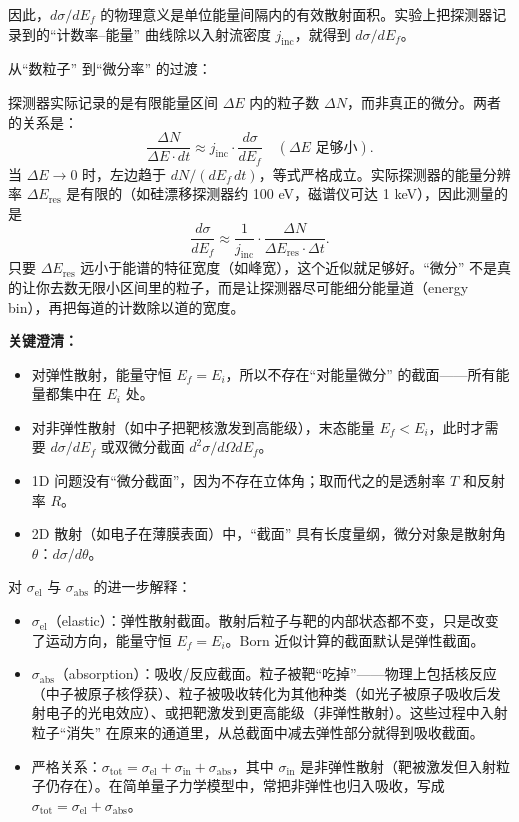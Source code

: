 \begin{derivationbox}[``截面'' 家族：各种微分截面的定义]
因此，$d\sigma/dE_f$ 的物理意义是单位能量间隔内的有效散射面积。实验上把探测器记录到的``计数率--能量'' 曲线除以入射流密度 $j_{\text{inc}}$，就得到 $d\sigma/dE_f$。

从``数粒子'' 到``微分率'' 的过渡：

探测器实际记录的是有限能量区间 $\Delta E$ 内的粒子数 $\Delta N$，而非真正的微分。两者的关系是：
\[
\frac{\Delta N}{\Delta E \cdot dt} \approx j_{\text{inc}} \cdot \frac{d\sigma}{dE_f} \quad (\Delta E \text{ 足够小}).
\]
当 $\Delta E \to 0$ 时，左边趋于 $dN/(dE_f\, dt)$，等式严格成立。实际探测器的能量分辨率 $\Delta E_{\text{res}}$ 是有限的（如硅漂移探测器约 100 eV，磁谱仪可达 1 keV），因此测量的是
\[
\frac{d\sigma}{dE_f} \approx \frac{1}{j_{\text{inc}}} \cdot \frac{\Delta N}{\Delta E_{\text{res}} \cdot \Delta t}.
\]
只要 $\Delta E_{\text{res}}$ 远小于能谱的特征宽度（如峰宽），这个近似就足够好。``微分'' 不是真的让你去数无限小区间里的粒子，而是让探测器尽可能细分能量道（energy bin），再把每道的计数除以道的宽度。

\textbf{关键澄清：}
\begin{itemize}
    \item 对弹性散射，能量守恒 $E_f = E_i$，所以不存在``对能量微分'' 的截面——所有能量都集中在 $E_i$ 处。
    \item 对非弹性散射（如中子把靶核激发到高能级），末态能量 $E_f < E_i$，此时才需要 $d\sigma/dE_f$ 或双微分截面 $d^2\sigma/d\Omega dE_f$。
    \item 1D 问题没有``微分截面''，因为不存在立体角；取而代之的是透射率 $T$ 和反射率 $R$。
    \item 2D 散射（如电子在薄膜表面）中，``截面'' 具有长度量纲，微分对象是散射角 $\theta$：$d\sigma/d\theta$。
\end{itemize}

对 $\sigma_{\text{el}}$ 与 $\sigma_{\text{abs}}$ 的进一步解释：
\begin{itemize}
    \item $\sigma_{\text{el}}$（elastic）：弹性散射截面。散射后粒子与靶的内部状态都不变，只是改变了运动方向，能量守恒 $E_f = E_i$。Born 近似计算的截面默认是弹性截面。
    \item $\sigma_{\text{abs}}$（absorption）：吸收/反应截面。粒子被靶``吃掉''——物理上包括核反应（中子被原子核俘获）、粒子被吸收转化为其他种类（如光子被原子吸收后发射电子的光电效应）、或把靶激发到更高能级（非弹性散射）。这些过程中入射粒子``消失'' 在原来的通道里，从总截面中减去弹性部分就得到吸收截面。
    \item 严格关系：$\sigma_{\text{tot}} = \sigma_{\text{el}} + \sigma_{\text{in}} + \sigma_{\text{abs}}$，其中 $\sigma_{\text{in}}$ 是非弹性散射（靶被激发但入射粒子仍存在）。在简单量子力学模型中，常把非弹性也归入吸收，写成 $\sigma_{\text{tot}} = \sigma_{\text{el}} + \sigma_{\text{abs}}$。
\end{itemize}
\end{derivationbox}

